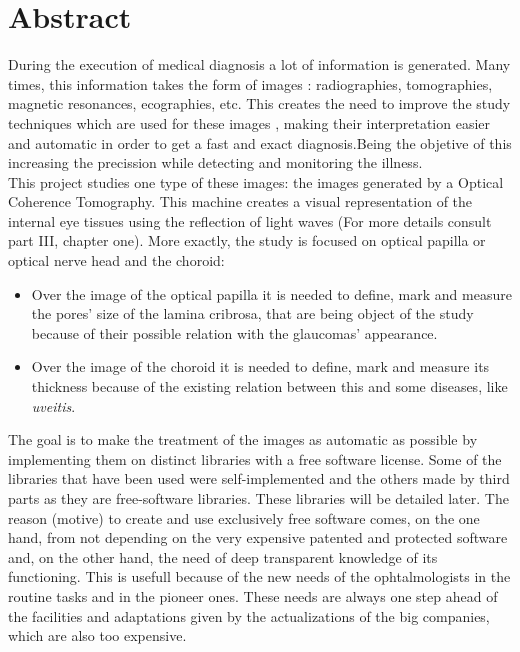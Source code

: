 \newpage

\section*{Abstract}
During the execution of medical diagnosis a lot of information is generated.
Many times, this information takes the form of images
\emph{\citep*[1. The Analysis of Medical Images, 2. Digital Image
  Acquisition]{toennies2012guide}}: radiographies, tomographies,
magnetic resonances, ecographies, etc.
This creates the need to improve the study techniques which are used
for these images \emph{\citep*[4. Image Enhancement]{toennies2012guide}},
making their interpretation easier and automatic in order to
get a fast and exact diagnosis.Being the objetive of this increasing the 
precission while detecting and monitoring the illness.\\
This project studies one type of these images: the images generated
by a Optical Coherence Tomography. This machine creates a visual
representation of the internal eye tissues using the reflection of 
light waves (For more details consult part III, chapter one). More
exactly, the study is focused on optical papilla or optical nerve head
and the choroid:
\begin{itemize}
\item Over the image of the optical papilla it is needed to define, mark and measure
  the pores' size of the lamina cribrosa, that are being object of the
  study because of their possible relation with the \gls{glaucoma}s' 
  appearance.
\item Over the image of the choroid it is needed to define, mark and measure its
  thickness because of the existing relation between this and some diseases,
  like \emph{\gls{uveitis}}.
\end{itemize}
The goal is to make the treatment of the images as automatic as possible 
by implementing them on distinct libraries with a free software
license. Some of the libraries that have been used were self-implemented and the others
made by third parts as they are free-software libraries. These
libraries will be detailed later. The reason (motive) to create and use exclusively
free software comes, on the one hand, from not depending on the very
expensive patented and protected software and, on the other hand,
the need of deep transparent knowledge of its functioning. This is
usefull because of the new needs of the ophtalmologists in the
routine tasks and in the pioneer ones. These needs are always one step
ahead of the facilities and adaptations given by the actualizations
of the big companies, which are also too expensive.